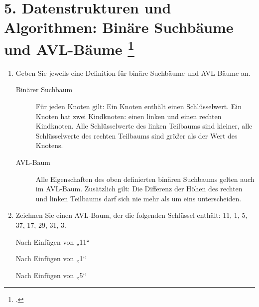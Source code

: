 \documentclass{lehramt-informatik-aufgabe}
\begin{document}
\section{5. Datenstrukturen und Algorithmen: Binäre Suchbäume und AVL-Bäume
\footcite{46115:2010:03}}

\begin{enumerate}
\item Geben Sie jeweils eine Definition für binäre Suchbäume und
AVL-Bäume an.

\begin{liAntwort}

\begin{description}
\item[Binärer Suchbaum] Für jeden Knoten gilt: Ein Knoten enthält einen
Schlüsselwert. Ein Knoten hat zwei Kindknoten: einen linken und einen
rechten Kindknoten. Alle Schlüsselwerte des linken Teilbaums sind
kleiner, alle Schlüsselwerte des rechten Teilbaums sind größer als der
Wert des Knotens.

\item[AVL-Baum] Alle Eigenschaften des oben definierten binären
Suchbaums gelten auch im AVL-Baum. Zusätzlich gilt: Die Differenz der
Höhen des rechten und linken Teilbaums darf sich nie mehr als um eins
unterscheiden.
\end{description}

\end{liAntwort}

\item Zeichnen Sie einen AVL-Baum, der die folgenden Schlüssel enthält:
11, 1, 5, 37, 17, 29, 31, 3.

\begin{liAntwort}
\begin{liDiagramm}{Nach Einfügen von „11“}
\end{liDiagramm}

\begin{liDiagramm}{Nach Einfügen von „1“}
\end{liDiagramm}

\begin{liDiagramm}{Nach Einfügen von „5“}
\end{liDiagramm}


\end{liAntwort}
\end{enumerate}
\end{document}
